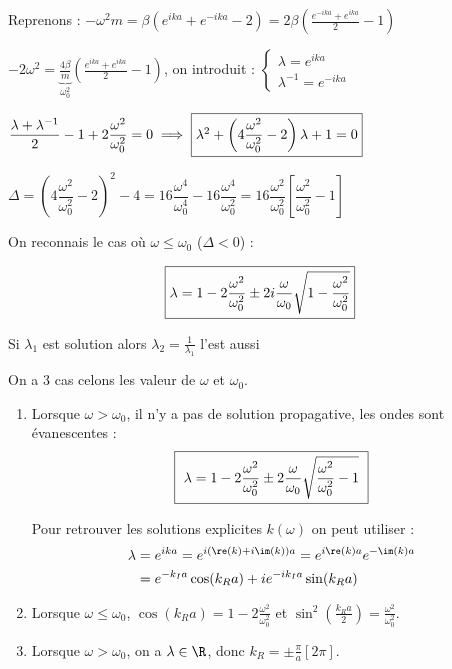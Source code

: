 \documentclass[12pt,a4paper]{article}
\begin{document}
	Reprenons : $-\omega^2m = \beta\left(e^{ika}+e^{-ika}-2\right) = 2\beta \left(\frac{e^{-ika}+e^{ika}}{2} - 1 \right)$
	
	$-2\omega^2 = \underbrace{\frac{4\beta}{m}}_{\omega_0^2}\left(\frac{e^{ika}+e^{ika}}{2} - 1\right)$, on introduit : $\begin{cases}
		\lambda = e^{ika}\\
		\lambda^{-1} = e^{-ika}
	\end{cases}$ 
	
	$\dfrac{\lambda+\lambda^{-1}}{2} - 1 + 2 \dfrac{\omega^2}{\omega_0^2} = 0 \implies \fbox{$\lambda^2 + \left(4\dfrac{\omega^2}{\omega_0^2}-2\right)\lambda + 1 = 0$}$
	
	$\Delta = \left(4\dfrac{\omega^2}{\omega_0^2}-2\right)^2-4 = 16\dfrac{\omega^4}{\omega_0^4} - 16 \dfrac{\omega^4}{\omega_0^2} = 16\dfrac{\omega^2}{\omega_0^2}\left[\dfrac{\omega^2}{\omega_0^2} - 1\right]$\\
	
	\begin{minipage}[t]{8cm}
		On reconnais le cas où $\omega \leq \omega_0$ ($\Delta < 0$) :
		
		\[
		\fbox{$
			\lambda = 1 - 2 \dfrac{\omega^2}{\omega_0^2} \pm 2i \dfrac{\omega}{\omega_0}\sqrt{1-\dfrac{\omega^2}{\omega_0^2}}
			$}	
		\]
	\end{minipage}\hspace{1cm}\begin{minipage}[t]{5cm}
		\fbox{\rouge{!}} Si $\lambda_1$ est solution alors $\lambda_2 = \frac{1}{\lambda_1}$ l'est aussi
	\end{minipage}
	
	
	On a 3 cas celons les valeur de $\omega$ et $\omega_0$.
	\begin{enumerate}
		\item Lorsque $\omega > \omega_0$, il n'y a pas de solution propagative, les ondes sont évanescentes :
		\[
		\fbox{
			$
			\lambda = 1 - 2 \dfrac{\omega^2}{\omega_0^2} \pm 2 \dfrac{\omega}{\omega_0} \sqrt{\dfrac{\omega^2}{\omega_0^2}-1}
			$
		}
		\]
		
		Pour retrouver les solutions explicites $k(\omega)$ on peut utiliser : 
		\[
		\begin{aligned}
			\lambda 
			&= e^{ika} = e^{i\left(\re(k)+i\im(k)\right)a} = e^{i\re(k)a}e^{-\im(k)a}\\
			&= e^{-k_I a }\cos(k_R a) + i e^{-ik_I a}\sin(k_R a)
		\end{aligned}
		\]
		
		\item Lorsque $\omega \leq \omega_0$, $\cos(k_Ra) = 1-2\frac{\omega^2}{\omega_0^2}$ et $\sin^2(\frac{k_R a}{2}) = \frac{\omega^2}{\omega_0^2}$.
		
		\item Lorsque $\omega > \omega_0$, on a $\lambda \in \R$, donc $k_R = \pm \frac{\pi}{a} \left[2\pi\right]$.
	\end{enumerate}
	
\end{document}
